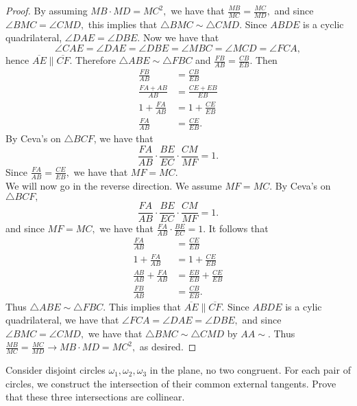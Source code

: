 \documentclass[letterpaper,oneside]{scrartcl}
\providecommand{\ol}{\overline}
\begin{document}
\begin{proof}
  By assuming $MB\cdot  MD = MC^2,$ we have that $\frac{MB}{MC} = \frac{MC}{MD},$ and since $\angle BMC = \angle CMD,$ this implies that $\triangle BMC \sim \triangle CMD$. Since $ABDE$ is a cyclic quadrilateral, $\angle DAE = \angle DBE.$ Now we have that
  $$\angle CAE = \angle DAE = \angle DBE = \angle MBC = \angle MCD = \angle FCA,$$
  hence $\ol{AE} \parallel \ol{CF}.$ Therefore $\triangle ABE \sim \triangle FBC$ and $\frac{FB}{AB} = \frac{CB}{EB}.$ Then
  \begin{align*}
    \frac{FB}{AB}      & = \frac{CB}{EB}      \\
    \frac{FA + AB}{AB} & = \frac{CE + EB}{EB} \\
    1 + \frac{FA}{AB}  & = 1 + \frac{CE}{EB}  \\
    \frac{FA}{AB}      & =\frac{CE}{EB}.
  \end{align*}
  By Ceva's on $\triangle BCF$, we have that
  $$\frac{FA}{AB}\cdot\frac{BE}{EC}\cdot\frac{CM}{MF} = 1.$$
  Since $\frac{FA}{AB}=\frac{CE}{EB},$ we have that $MF = MC.$ \\

  We will now go in the reverse direction. We assume $MF = MC.$ By Ceva's on $\triangle BCF,$
  $$\frac{FA}{AB}\cdot\frac{BE}{EC}\cdot\frac{CM}{MF} = 1.$$
  and since $MF = MC,$ we have that $\frac{FA}{AB}\cdot\frac{BE}{EC} = 1.$ It follows that
  \begin{align*}
    \frac{FA}{AB}                 & = \frac{CE}{EB}                 \\
    1 + \frac{FA}{AB}             & = 1 + \frac{CE}{EB}             \\
    \frac{AB}{AB} + \frac{FA}{AB} & = \frac{EB}{EB} + \frac{CE}{EB} \\
    \frac{FB}{AB}                 & = \frac{CB}{EB}.
  \end{align*}
  Thus $\triangle ABE \sim \triangle FBC.$ This implies that $\ol{AE} \parallel \ol{CF}.$  Since $ABDE$ is a cylic quadrilateral, we have that $\angle FCA = \angle DAE = \angle DBE,$ and since $\angle BMC = \angle CMD,$ we have that $\triangle BMC \sim \triangle CMD$ by $AA\sim.$ Thus $\frac{MB}{MC} = \frac{MC}{MD} \rightarrow MB\cdot MD = MC^2,$ as desired.
\end{proof}

\begin{theorem*}
  Consider disjoint circles $\omega_1, \omega_2, \omega_3$ in the plane, no two congruent. For each pair of circles, we construct the intersection of their common external tangents. Prove that these three intersections are collinear.
\end{theorem*}
\end{document}
